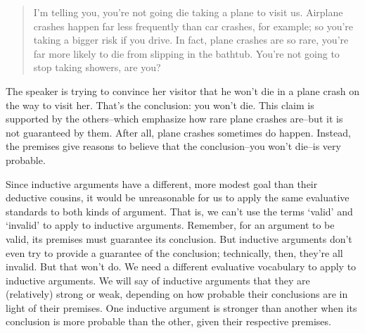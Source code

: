 \begin{quote}
I'm telling you, you're not going die taking a plane to visit us. Airplane crashes happen far
less frequently than car crashes, for example; so you're taking a bigger risk if you drive. In
fact, plane crashes are so rare, you're far more likely to die from slipping in the bathtub.
You're not going to stop taking showers, are you?
\end{quote}

The speaker is trying to convince her visitor that he won't die in a plane crash on the way to visit
her. That's the conclusion: you won't die. This claim is supported by the others--which emphasize
how rare plane crashes are--but it is not guaranteed by them. After all, plane crashes sometimes
do happen. Instead, the premises give reasons to believe that the conclusion--you won't die--is
very probable.

Since inductive arguments have a different, more modest goal than their deductive cousins, it
would be unreasonable for us to apply the same evaluative standards to both kinds of argument.
That is, we can't use the terms `valid' and `invalid' to apply to inductive arguments. Remember,
for an argument to be valid, its premises must guarantee its conclusion. But inductive arguments
don't even try to provide a guarantee of the conclusion; technically, then, they're all invalid. But
that won't do. We need a different evaluative vocabulary to apply to inductive arguments. We will
say of inductive arguments that they are (relatively) strong or weak, depending on how probable
their conclusions are in light of their premises. One inductive argument is stronger than another
when its conclusion is more probable than the other, given their respective premises.


